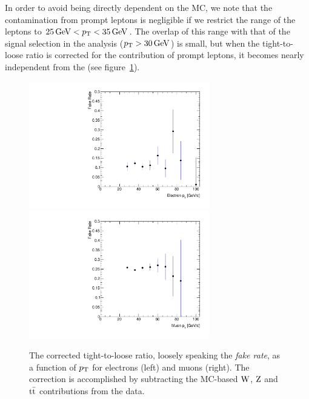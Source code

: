 In order to avoid being directly dependent on the MC, we note that the
contamination from prompt leptons is negligible if we restrict the \pt range
of the leptons to $\unit[25]{GeV} < \pt < \unit[35]{GeV}$. The overlap of
this \pt range with that of the signal selection in the analysis ($\pt >
\unit[30]{GeV}$) is small, but when the tight-to-loose ratio is corrected
for the contribution of prompt leptons, it becomes nearly independent from
the \pt (see figure~\ref{fig:CorFRvsLepPt}).
\begin{figure}[htb]
    \centering
\includegraphics[width=0.7\textwidth]{images/pdf/h_FR_ElPt} \\
\includegraphics[width=0.7\textwidth]{images/pdf/h_FR_MuPt} 
\caption{The corrected tight-to-loose ratio, loosely speaking the
    \emph{fake rate}, as a function of $p_\mathrm{T}$ for electrons (left) and muons (right). The correction is accomplished by subtracting the MC-based 
         $\mathrm{W}$, $\mathrm{Z}$ and $\mathrm{t}\bar{\mathrm{t}}$ contributions from the data.}
\label{fig:CorFRvsLepPt}
\end{figure}

